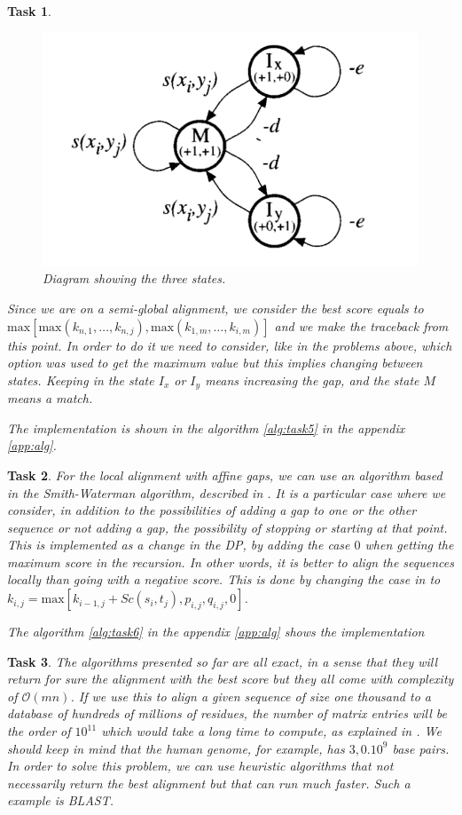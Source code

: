 \documentclass[11pt]{article} %
\theoremstyle{problemstyle}
\newtheorem{exercise}{Task}	%
\theoremstyle{problemstyle}
\renewcommand*{\O}{\mathcal{O}}
\begin{document}
\begin{exercise}
\begin{sloppypar}
\begin{figure}[h]
	\centerline{\includegraphics[width=0.5\linewidth]{automaton.png}}
	\caption{Diagram showing the three states.}
	\label{fig:automatom}
\end{figure}

Since we are on a semi-global alignment, we consider the best score equals to ${\text{max}[\text{max}(k_{n,1},\dots,k_{n,j}),\text{max}(k_{1,m},\dots ,k_{i,m})]}$ and we make the traceback from this point. In order to do it we need to consider, like in the problems above, which option was used to get the maximum value but this implies changing between states. Keeping in the state $I_x$ or $I_y$ means increasing the gap, and the state $M$ means a match.
\end{sloppypar}

The implementation is shown in the algorithm \ref{alg:task5} in the appendix \ref{app:alg}.

\end{exercise}

\begin{exercise} %
For the local alignment with affine gaps, we can use an algorithm based in the Smith-Waterman algorithm, described in \cite{durbin}. It is a particular case where we consider, in addition to the possibilities of adding a gap to one or the other sequence or not adding a gap, the possibility of stopping or starting at that point. This is implemented as a change in the DP, by adding the case $0$ when getting the maximum score in the recursion. In other words, it is better to align the sequences locally than going with a negative score. This is done by changing the case in  to ${k_{i,j}=\text{max}[k_{i-1,j}+Sc(s_i,t_j), p_{i,j}, q_{i,j},0]}$.

The algorithm \ref{alg:task6} in the appendix \ref{app:alg} shows the implementation

\end{exercise}

\begin{exercise} %
The algorithms presented so far are all exact, in a sense that they will return for sure the alignment with the best score but they all come with complexity of $\O(mn)$. If we use this to align a given sequence of size one thousand to a database of hundreds of millions of residues, the number of matrix entries will be the order of $10^{11}$ which would take a long time to compute, as explained in \cite{durbin}. We should keep in mind that the human genome, for example, has $3,0.10^9$ base pairs. In order to solve this problem, we can use heuristic algorithms that not necessarily return the best alignment but that can run much faster. Such a example is BLAST.
\end{exercise}
\end{document}
